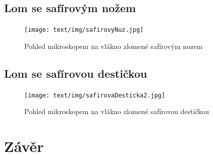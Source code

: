 \documentclass{protokol}
\begin{document}
  \newpage
  \clearpage

  \subsection{Lom se safírovým nožem}

  \begin{figure}[h!]
    \centering
    \texttt{[image: text/img/safirovyNuz.jpg]} 
    \caption{\label{fig:safirNuz} Pohled mikroskopem na vlákno zlomené safírovým nozem}
  \end{figure}


  \subsection{Lom se safírovou destičkou}

    \begin{figure}[h!]
      \centering
      \texttt{[image: text/img/safirovaDesticka2.jpg]} 
      \caption{\label{fig:safirNuz} Pohled mikroskopem na vlákno zlomené safírovou destičkou}
    \end{figure}

  

  \newpage
  \clearpage

  \section{Závěr}
    

\end{document}
